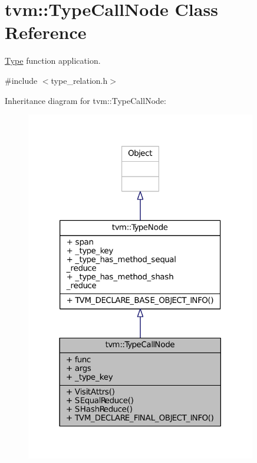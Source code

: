 \hypertarget{classtvm_1_1TypeCallNode}{}\section{tvm\+:\+:Type\+Call\+Node Class Reference}
\label{classtvm_1_1TypeCallNode}


\hyperlink{classtvm_1_1Type}{Type} function application.  




{\ttfamily \#include $<$type\+\_\+relation.\+h$>$}



Inheritance diagram for tvm\+:\+:Type\+Call\+Node\+:
\nopagebreak
\begin{figure}[H]
\begin{center}
\leavevmode
\includegraphics[width=285pt]{classtvm_1_1TypeCallNode__inherit__graph}
\end{center}
\end{figure}


